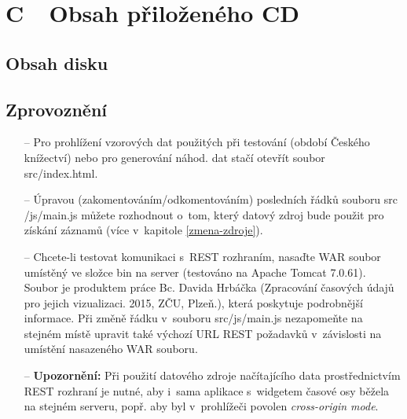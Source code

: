 \chapter*{C\ \ Obsah přiloženého CD}   %
\thispagestyle{empty}

\section*{Obsah disku}
\renewcommand*\DTstyle{\sf}

\section*{Zprovoznění}
\begin{itemize}
\item[--] Pro prohlížení vzorových dat použitých při testování (období Českého kní\-žectví) nebo pro generování náhod. dat stačí otevřít soubor {\sf src/index.html}.
\item[--] Úpravou (zakomentováním/odkomentováním) posledních řádků souboru {\sf src\\/js/main.js} můžete rozhodnout o~tom, který datový zdroj bude použit pro získání záznamů (více v~kapitole \ref{zmena-zdroje}).
\item[--] Chcete-li testovat komunikaci s~REST rozhraním, nasaďte WAR soubor umístěný ve složce {\sf bin} na server (testováno na Apache Tomcat 7.0.61). Soubor je produktem práce Bc. Davida Hrbáčka (Zpracování časových údajů pro jejich vizualizaci. 2015, ZČU, Plzeň.), která poskytuje podrobnější informace. Při změně řádku v~souboru {\sf src/js/main.js} nezapomeňte na stejném místě upravit také výchozí URL REST požadavků v~závislosti na umístění nasazeného WAR souboru.
\item[--] {\bf Upozornění:} Při použití datového zdroje načítajícího data prostřednictvím REST rozhraní je nutné, aby i~sama aplikace s~widgetem časové osy běžela na stejném serveru, popř. aby byl v~prohlížeči povolen \emph{cross-origin mode}.
\end{itemize}